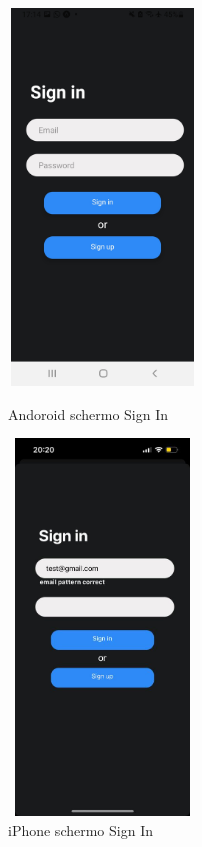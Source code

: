 \begin{figure}[H]
    \begin{minipage}[h]{0.47\textwidth}
        \centering
        \includegraphics[width=5cm, height=10cm]{images/immaginiAndroid/signIn.jpg}
        \caption{\label{signInAndroid} Andoroid schermo Sign In}
    \end{minipage}
    \hfill
    \begin{minipage}[h]{0.47\textwidth}
        \centering
        \includegraphics[width=5cm, height=10cm]{images/immaginiPhone/signIn.jpeg}
        \caption{\label{signIniPhone}iPhone schermo Sign In}
    \end{minipage}
    \begin{minipage}[h]{0.47\textwidth}

\end{minipage}
\end{figure}
